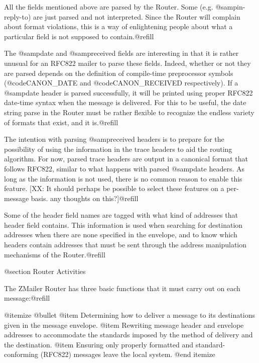 {All the fields mentioned above are parsed by the Router.  Some (e.g.
@samp{in-reply-to}) are just parsed and not interpreted.  Since the Router will
complain about format violations, this is a way of enlightening people about
what a particular field is not supposed to contain.@refill

The @samp{date} and @samp{received} fields are interesting in that it is
rather unusual for an RFC822 mailer to parse these fields.  Indeed, whether
or not they are parsed depends on the definition of compile-time preprocessor
symbols (@code{CANON_DATE} and @code{CANON_RECEIVED} respectively).
If a @samp{date} header is parsed successfully, it will be printed using
proper RFC822 date-time syntax when the message is delivered.  For this to
be useful, the date string parse in the Router must be rather flexible to
recognize the endless variety of formats that exist, and it is.@refill

The intention with parsing @samp{received} headers is to prepare for the
possibility of using the information in the trace headers to aid the
routing algorithm.  For now, parsed trace headers are output in a canonical
format that follows RFC822, similar to what happens with parsed @samp{date}
headers.  As long as the information is not used, there is no common reason
to enable this feature. [XX: It should perhaps be possible to select these
features on a per-message basis. any thoughts on this?]@refill

Some of the header field names are tagged with what kind of addresses that
header field contains.  This information is used when searching for
destination addresses when there are none specified in the envelope, and to
know which headers contain addresses that must be sent through the address
manipulation mechanisms of the Router.@refill

@section Router Activities

The ZMailer Router has three basic functions that it must carry out on each
message:@refill

@itemize @bullet
@item
Determining how to deliver a message to its destinations given in the
message envelope.
@item
Rewriting message header and envelope addresses to accommodate the standards
imposed by the method of delivery and the destination.
@item
Ensuring only properly formatted and standard-conforming (RFC822) messages
leave the local system.
@end itemize

}
